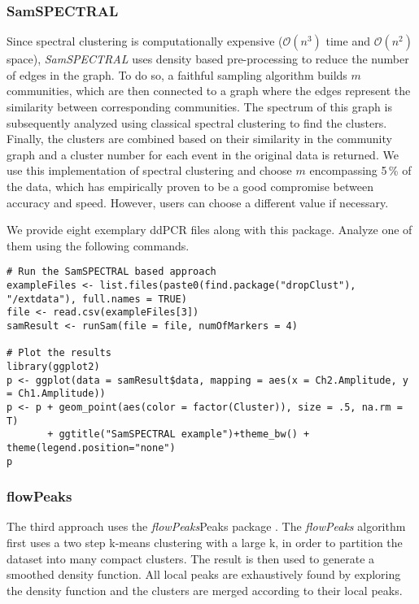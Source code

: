 \documentclass{article}
\begin{document}
\subsubsection{SamSPECTRAL}
Since spectral clustering is computationally expensive ($\mathcal{O}(n^3)$ time and $\mathcal{O}(n^2)$ space), \emph{SamSPECTRAL} uses density based pre-processing to reduce the number of edges in the graph. To do so, a faithful sampling algorithm builds $m$ communities, which are then connected to a graph where the edges represent the similarity between corresponding communities. The spectrum of this graph is subsequently analyzed using classical spectral clustering to find the clusters. Finally, the clusters are combined based on their similarity in the community graph and a cluster number for each event in the original data is returned. We use this implementation of spectral clustering and choose $m$ encompassing 5$\,$\% of the data, which has empirically proven to be a good compromise between accuracy and speed. However, users can choose a different value if necessary.

We provide eight exemplary ddPCR files along with this package. Analyze one of them using the following commands.
\begin{verbatim}
# Run the SamSPECTRAL based approach
exampleFiles <- list.files(paste0(find.package("dropClust"), "/extdata"), full.names = TRUE)
file <- read.csv(exampleFiles[3])
samResult <- runSam(file = file, numOfMarkers = 4)

# Plot the results
library(ggplot2)
p <- ggplot(data = samResult$data, mapping = aes(x = Ch2.Amplitude, y = Ch1.Amplitude))
p <- p + geom_point(aes(color = factor(Cluster)), size = .5, na.rm = T)
       + ggtitle("SamSPECTRAL example")+theme_bw() + theme(legend.position="none")
p
\end{verbatim}

\subsubsection{flowPeaks}
The third approach uses the \emph{flowPeaks}Peaks package \cite{ge2012flowpeaks}. The \emph{flowPeaks} algorithm first uses a two step k-means clustering with a large k, in order to partition the dataset into many compact clusters.
The result is then used to generate a smoothed density function.
All local peaks are exhaustively found by exploring the density function and the clusters are merged according to their local peaks. 
\end{document}
